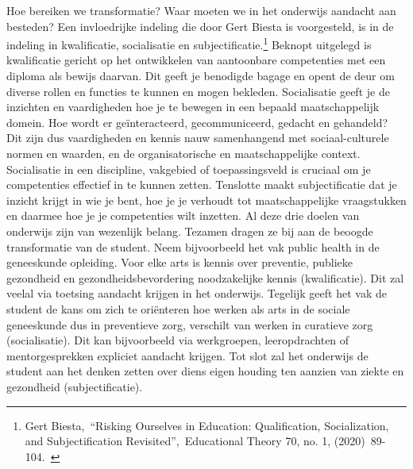 \documentclass{jote-book}
\begin{document}
	Hoe bereiken we transformatie? Waar moeten we in het onderwijs aandacht aan besteden? Een invloedrijke indeling die door Gert Biesta is voorgesteld, is in de indeling in kwalificatie, socialisatie en subjectificatie.\footnote{Gert Biesta, “Risking Ourselves in Education: Qualification, Socialization, and Subjectification Revisited”, Educational Theory 70, no. 1, (2020) 89-104. } Beknopt uitgelegd is kwalificatie gericht op het ontwikkelen van aantoonbare competenties met een diploma als bewijs daarvan. Dit geeft je benodigde bagage en opent de deur om diverse rollen en functies te kunnen en mogen bekleden. Socialisatie geeft je de inzichten en vaardigheden hoe je te bewegen in een bepaald maatschappelijk domein. Hoe wordt er geïnteracteerd, gecommuniceerd, gedacht en gehandeld? Dit zijn dus vaardigheden en kennis nauw samenhangend met sociaal-culturele normen en waarden, en de organisatorische en maatschappelijke context. Socialisatie in een discipline, vakgebied of toepassingsveld is cruciaal om je competenties effectief in te kunnen zetten. Tenslotte maakt subjectificatie dat je inzicht krijgt in wie je bent, hoe je je verhoudt tot maatschappelijke vraagstukken en daarmee hoe je je competenties wilt inzetten. Al deze drie doelen van onderwijs zijn van wezenlijk belang. Tezamen dragen ze bij aan de beoogde transformatie van de student. Neem bijvoorbeeld het vak public health in de geneeskunde opleiding. Voor elke arts is kennis over preventie, publieke gezondheid en gezondheidsbevordering noodzakelijke kennis (kwalificatie). Dit zal veelal via toetsing aandacht krijgen in het onderwijs. Tegelijk geeft het vak de student de kans om zich te oriënteren hoe werken als arts in de sociale geneeskunde dus in preventieve zorg, verschilt van werken in curatieve zorg (socialisatie). Dit kan bijvoorbeeld via werkgroepen, leeropdrachten of mentorgesprekken expliciet aandacht krijgen. Tot slot zal het onderwijs de student aan het denken zetten over diens eigen houding ten aanzien van ziekte en gezondheid (subjectificatie).
\end{document}
